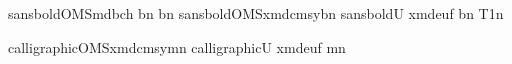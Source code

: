 \makeatletter
\renewcommand{\seriesdefault}{\bfseries@sf}
\makeatother
\Mathastext[sansbold]
     {sansbold}{OMS}{mdbch}  {b}{n}%
  {b}{n}%
\SetMathAlphabet{\mathcal}  {sansbold}{OMS}{xmdcmsy}{b}{n}%
\SetMathAlphabet{\mathfrak} {sansbold}{U}  {xmdeuf} {b}{n}%
\Mathastextupgreek
\MathastextupGreek
\makeatletter
{}    {T1}{\familydefault}{\mdseries@sf}{n}
\makeatother

\SetMathAlphabet{\mathcal}  {calligraphic}{OMS}{xmdcmsy}{m}{n}%
\SetMathAlphabet{\mathfrak} {calligraphic}{U}  {xmdeuf} {m}{n}
\let \mathcalaux  \mathcal
\let \mathfrakaux \mathfrak
\renewcommand{\mathcal}[1]{%
	\textnormal{\IfInSansMode$\mathcalaux{#1}$%
	\else\mathastextversion{calligraphic}$\mathcalaux{#1}$\mathversion{normal}%
	\fi\relax}%
}
\renewcommand{\mathfrak}[1]{%
	\textnormal{\IfInSansMode$\mathfrakaux{#1}$%
	\else\mathastextversion{calligraphic}$\mathfrakaux{#1}$\mathversion{normal}%
	\fi\relax}%
}

\let \oldpm    \pm
\let \oldtimes \times
\let \olddiv   \div
\makeatletter
\newcommand{\pmsf}   {\mathbin{\textnormal{\usefont{TS1}{\sfdefault}{\f@series}{n}\char"B1}}}
\newcommand{\timessf}{\mathbin{\textnormal{\usefont{TS1}{\sfdefault}{\f@series}{n}\char"D6}}}
\newcommand{\divsf}  {\mathbin{\textnormal{\usefont{TS1}{\sfdefault}{\f@series}{n}\char"F6}}}
\makeatother

\newif\IfInSansMode
\newif\IfInBoldMode
\let \mathrmaux \mathrm
\newcommand{\renewmathcommands}{%
	\renewcommand{\mathnormal}[1]{\textsf{$##1$}}%
	\renewcommand{\mathrm}[1]{%
		\textrm{\mathversion{normal}\Mathastextstandardgreek$\mathrmaux{##1}$\mathastextversion{sans}}%
	}%
	\renewcommand{\mathup}[1]{%
		\textsf{\IfInBoldMode\mathastextversion{sansupbold}$##1$\mathastextversion{sansbold}\else\mathastextversion{sansup}$##1$\mathastextversion{sans}\fi\relax}%
	}%
	\renewcommand{\mathit}  [1]{\textsf{\mathastextversion{sans}$##1$}}%
	\renewcommand{\mathbf}  [1]{\textsf{\mathastextversion{sansbold}$##1$\mathastextversion{sans}}}%
	\renewcommand{\mathbfit}[1]{\textnormal{\mathastextversion{sansbold}$##1$\mathastextversion{sans}}}%
	\renewcommand{\pm}   {\pmsf}%
	\renewcommand{\times}{\timessf}%
	\renewcommand{\div}  {\divsf}%
}

